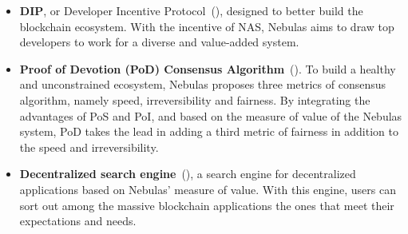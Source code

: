 {\begin{itemize}
	\item \textbf{DIP}, or Developer Incentive Protocol~(), designed to better build the blockchain ecosystem. With the incentive of NAS, Nebulas aims to draw top developers to work for a diverse and value-added system.
    
  \item \textbf{Proof of Devotion (PoD) Consensus Algorithm}~(). To build a healthy and unconstrained ecosystem, Nebulas proposes three metrics of consensus algorithm, namely speed, irreversibility and fairness. By integrating the advantages of PoS and PoI, and based on the measure of value of the Nebulas system, PoD takes the lead in adding a third metric of fairness in addition to the speed and irreversibility. 
  
  \item \textbf{Decentralized search engine}~(), a search engine for decentralized applications based on Nebulas’ measure of value. With this engine, users can sort out among the massive blockchain applications the ones that meet their expectations and needs.

\end{itemize}
}

